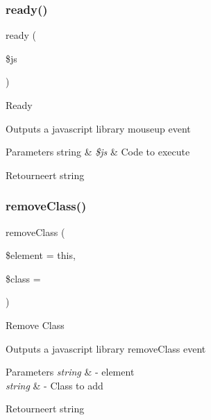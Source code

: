 \subsubsection{\texorpdfstring{ready()}{ready()}}
{\footnotesize\ttfamily ready (\begin{DoxyParamCaption}\item[{}]{\$js }\end{DoxyParamCaption})}

Ready

Outputs a javascript library mouseup event


\begin{DoxyParams}[1]{Parameters}
string & {\em \$js} & Code to execute \\
\hline
\end{DoxyParams}
\begin{DoxyReturn}{Retourneert}
string 
\end{DoxyReturn}
\mbox{\label{class_c_i___javascript_a909e52e0a7e3ddd7e6520965618d50f4}} 
\subsubsection{\texorpdfstring{removeClass()}{removeClass()}}
{\footnotesize\ttfamily remove\+Class (\begin{DoxyParamCaption}\item[{}]{\$element = {\ttfamily \textquotesingle{}this\textquotesingle{}},  }\item[{}]{\$class = {\ttfamily \textquotesingle{}\textquotesingle{}} }\end{DoxyParamCaption})}

Remove Class

Outputs a javascript library remove\+Class event


\begin{DoxyParams}{Parameters}
{\em string} & -\/ element \\
\hline
{\em string} & -\/ Class to add \\
\hline
\end{DoxyParams}
\begin{DoxyReturn}{Retourneert}
string 
\end{DoxyReturn}
\mbox{\label{class_c_i___javascript_a972b62f88e96fb29b179469e0d49329a}} 
